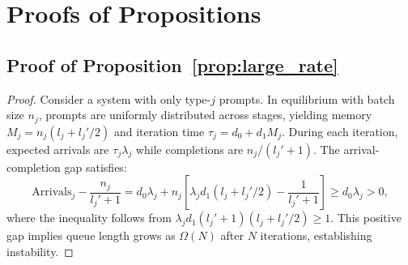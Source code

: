 %
%
%


\section{Proofs of Propositions}

\subsection{Proof of Proposition~\ref{prop:large_rate}}
\label{appendix:proof_large_rate}

\begin{proof}
Consider a system with only type-$j$ prompts. In equilibrium with batch size $n_j$, prompts are uniformly distributed across stages, yielding memory $M_j = n_j(l_j + l_j'/2)$ and iteration time $\tau_j = d_0 + d_1 M_j$. During each iteration, expected arrivals are $\tau_j \lambda_j$ while completions are $n_j/(l_j'+1)$. The arrival-completion gap satisfies:
$$\text{Arrivals}_j - \frac{n_j}{l_j'+1} = d_0\lambda_j + n_j\left[\lambda_j d_1 (l_j + l_j'/2) - \frac{1}{l_j'+1}\right] \geq d_0\lambda_j > 0,$$
where the inequality follows from $\lambda_j d_1 (l_j'+1)(l_j + l_j'/2) \geq 1$. This positive gap implies queue length grows as $\Omega(N)$ after $N$ iterations, establishing instability.
\end{proof}

